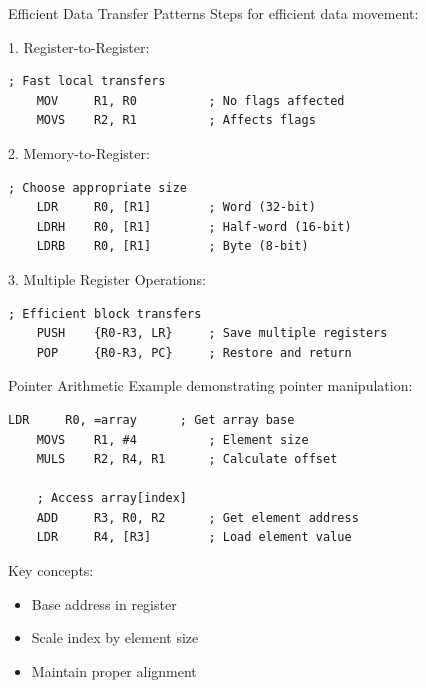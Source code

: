 \begin{KR}{Efficient Data Transfer Patterns}
Steps for efficient data movement:

1. Register-to-Register:
\begin{lstlisting}[language=armasm, style=basesmol]
    ; Fast local transfers
    MOV     R1, R0          ; No flags affected
    MOVS    R2, R1          ; Affects flags
\end{lstlisting}

2. Memory-to-Register:
\begin{lstlisting}[language=armasm, style=basesmol]
    ; Choose appropriate size
    LDR     R0, [R1]        ; Word (32-bit)
    LDRH    R0, [R1]        ; Half-word (16-bit)
    LDRB    R0, [R1]        ; Byte (8-bit)
\end{lstlisting}

3. Multiple Register Operations:
\begin{lstlisting}[language=armasm, style=basesmol]
    ; Efficient block transfers
    PUSH    {R0-R3, LR}     ; Save multiple registers
    POP     {R0-R3, PC}     ; Restore and return
\end{lstlisting}
\end{KR}











\begin{KR}{Pointer Arithmetic}
Example demonstrating pointer manipulation:
\begin{lstlisting}[language=armasm, style=basesmol]
    LDR     R0, =array      ; Get array base
    MOVS    R1, #4          ; Element size
    MULS    R2, R4, R1      ; Calculate offset
    
    ; Access array[index]
    ADD     R3, R0, R2      ; Get element address
    LDR     R4, [R3]        ; Load element value
\end{lstlisting}

Key concepts:
\begin{itemize}
  \item Base address in register
  \item Scale index by element size
  \item Maintain proper alignment
\end{itemize}
\end{KR}

